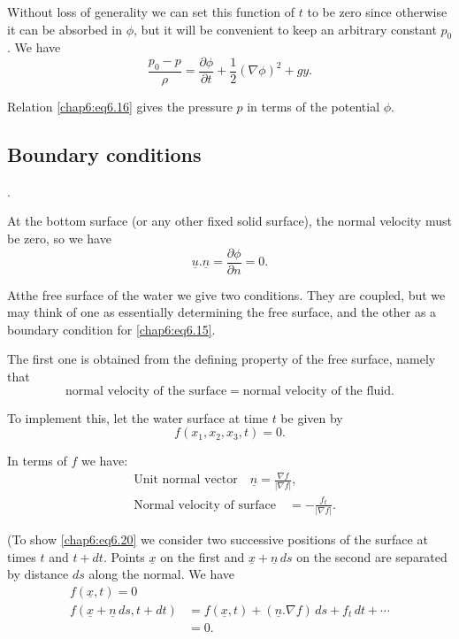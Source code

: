 Without loss of generality we can set this function of $t$ to be zero since otherwise it can be absorbed in $\phi$, but it will be convenient to keep an arbitrary constant $p_0$. We have 
\begin{equation}
\frac{p_0-p}{\rho}=\frac{\partial\phi}{\partial t}+\frac{1}{2}(\nabla\phi)^2+ gy.\tag{6.16}\label{chap6:eq6.16}
\end{equation}

Relation \eqref{chap6:eq6.16} gives the pressure $p$ in terms of the potential $\phi$. 

\subsection*{\bf Boundary conditions}.

At the bottom surface (or any other fixed solid surface), the normal velocity must be zero, so we have 
\begin{equation}
\underline{u}.\underline{n}=\frac{\partial\phi}{\partial n}=0. \tag{6.17}\label{chap6:eq6.17}
\end{equation}

At\pageoriginale the free surface of the water we give two conditions. They are coupled, but we may think of one as essentially determining the free surface, and the other as a boundary condition for \eqref{chap6:eq6.15}. 

The first one is obtained from the defining property of the free surface, namely that 
\begin{equation}
\text{normal velocity of the surface}=\text{normal velocity of the fluid}. \tag{6.18}\label{chap6:eq6.18}
\end{equation}

To implement this, let the water surface at time $t$ be given by 
\begin{equation}
f\left(x_1,x_2,x_3,t\right)=0.\tag{6.19}\label{chap6:eq6.19}
\end{equation}

In terms of $f$ we have:
\begin{equation}
\begin{aligned}
& \text{Unit normal vector}\quad \underline{n}=\frac{\nabla f}{|\nabla f|},\\
& \text{Normal velocity of surface}\quad = -\frac{f_t}{|\nabla f|}.
\end{aligned}\tag{6.20}\label{chap6:eq6.20}
\end{equation}

(To show \eqref{chap6:eq6.20} we consider two successive positions of the surface at times $t$ and $t+dt$. Points $\underline{x}$ on the first and $\underline{x}+\underline{n}\,ds$ on the second are separated by distance $ds$ along the normal. We have 
\begin{align*}
 f(\underline{x},t)=0 &\\
 f(\underline{x}+\underline{n}\,ds,t+dt) &=f(\underline{x},t)+(\underline{n}. \nabla f)\,ds+f_t\,dt+\cdots\\
  &=0.
\end{align*}

